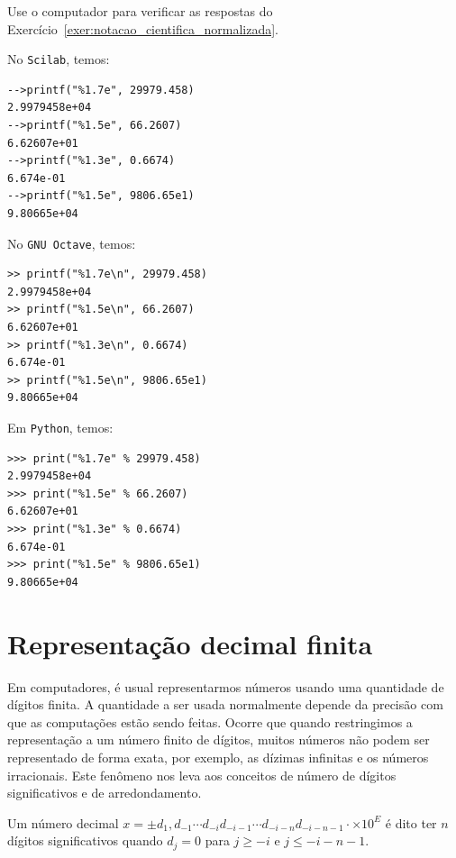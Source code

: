 \begin{exer}
  Use o computador para verificar as respostas do Exercício~\ref{exer:notacao_cientifica_normalizada}.
\end{exer}
\ifisscilab
\begin{resp}
No \verb+Scilab+, temos:
\begin{verbatim}
-->printf("%1.7e", 29979.458)
2.9979458e+04
-->printf("%1.5e", 66.2607)
6.62607e+01
-->printf("%1.3e", 0.6674)
6.674e-01
-->printf("%1.5e", 9806.65e1)
9.80665e+04
\end{verbatim}
\end{resp}
\fi
\ifisoctave
\begin{resp}
No \verb+GNU Octave+, temos:
\begin{verbatim}
>> printf("%1.7e\n", 29979.458)
2.9979458e+04
>> printf("%1.5e\n", 66.2607)
6.62607e+01
>> printf("%1.3e\n", 0.6674)
6.674e-01
>> printf("%1.5e\n", 9806.65e1)
9.80665e+04
\end{verbatim}
\end{resp}
\fi
\ifispython
\begin{resp}
Em \verb+Python+, temos:
\begin{verbatim}
>>> print("%1.7e" % 29979.458)
2.9979458e+04
>>> print("%1.5e" % 66.2607)
6.62607e+01
>>> print("%1.3e" % 0.6674)
6.674e-01
>>> print("%1.5e" % 9806.65e1)
9.80665e+04
\end{verbatim}
\end{resp}
\fi


\section{Representação decimal finita}

Em computadores, é usual representarmos números usando uma quantidade de dígitos finita. A quantidade a ser usada normalmente depende da precisão com que as computações estão sendo feitas. Ocorre que quando restringimos a representação a um número finito de dígitos, muitos números não podem ser representado de forma exata, por exemplo, as dízimas infinitas e os números irracionais. Este fenômeno nos leva aos conceitos de número de dígitos significativos e de arredondamento.

\begin{defn} Um número decimal $x = \pm d_1,d_{-1}\cdots d_{-i}d_{-i-1}\cdots d_{-i-n} d_{-i-n-1}\cdot \times 10^E$ é dito ter $n$ dígitos significativos quando $d_{j}=0$ para $j\geq -i$ e $j\leq-i-n-1$.
\end{defn}

